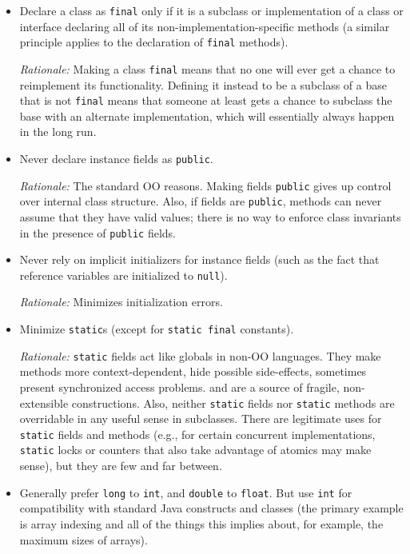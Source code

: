 \begin{itemize}
    \item 
    Declare a class as \texttt{final} only if it is a subclass or implementation of a class or interface declaring all of its non-implementation-specific methods (a similar principle applies to the declaration of \texttt{final} methods).

    \emph{Rationale:} Making a class \texttt{final} means that no one will ever get a chance to reimplement its functionality. Defining it instead to be a subclass of a base that is not \texttt{final} means that someone at least gets a chance to subclass the base with an alternate implementation, which will essentially always happen in the long run.

    \item
    Never declare instance fields as \texttt{public}.

    \emph{Rationale:} The standard OO reasons. Making fields \texttt{public} gives up control over internal class structure. Also, if fields are \texttt{public}, methods can never assume that they have valid values; there is no way to enforce class invariants in the presence of \texttt{public} fields.

    \item 
    Never rely on implicit initializers for instance fields (such as the fact that reference variables are initialized to \texttt{null}).

    \emph{Rationale:} Minimizes initialization errors.

    \item
    Minimize \texttt{static}s (except for \texttt{static final} constants).

    \emph{Rationale:} \texttt{static} fields act like globals in non-OO languages. They make methods more context-dependent, hide possible side-effects, sometimes present synchronized access problems. and are a source of fragile, non-extensible constructions. Also, neither \texttt{static} fields nor \texttt{static} methods are overridable in any useful sense in subclasses. There are legitimate uses for \texttt{static} fields and methods (e.g., for certain concurrent implementations, \texttt{static} locks or counters that also take advantage of atomics may make sense), but they are few and far between.

    \item 
    Generally prefer \texttt{long} to \texttt{int}, and \texttt{double} to \texttt{float}. But use \texttt{int} for compatibility with standard Java constructs and classes (the primary example is array indexing and all of the things this implies about, for example, the maximum sizes of arrays).


\end{itemize}
